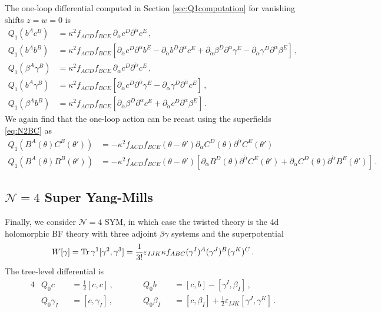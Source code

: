 \documentclass[11pt]{article}
\begin{document}
The one-loop differential computed in Section \ref{sec:Q1computation} for vanishing shifts $z=w=0$ is
\begin{align}
     Q_1 (b^A c^B ) 
        &=  \kappa^2 f_{ACD}f_{BCE} \, \partial_{\dot\alpha} c^D\partial^{\dot\alpha} c^E\,,  \\
     Q_1(b^A b^B) 
        &= \kappa^2 f_{ACD}f_{BCE} \left[\partial_{\dot\alpha} c^D \partial^{\dot\alpha} b^E -\partial_{\dot\alpha} b^D\partial^{\dot\alpha} c^E + \partial_{\dot\alpha}\beta^D\partial^{\dot\alpha}{\gamma}^E  - \partial_{\dot\alpha} {\gamma}^D\partial^{\dot\alpha}\beta^E \right] \,,\\
     Q_1 (\beta^A {\gamma}^B ) 
        &=  \kappa^2 f_{ACD}f_{BCE} \, \partial_{\dot\alpha} c^D\partial^{\dot\alpha} c^E\,, \\
    Q_1(b^A{\gamma}^B) 
        &= \kappa^2 f_{ACD}f_{BCE} \left[\partial_{\dot\alpha} c^D \partial^{\dot\alpha} {\gamma}^E-\partial_{\dot\alpha} \gamma^D \partial^{\dot\alpha} c^E\right]\,, \\
    Q_1(\beta^A b^B) 
        &= \kappa^2 f_{ACD}f_{BCE} \left[ \partial_{\dot\alpha} \beta^D \partial^{\dot\alpha} c^E + \partial_{\dot\alpha} c^D \partial^{\dot\alpha} \beta^E \right] \, .
\end{align}
We again find that the one-loop action can be recast using the superfields \eqref{eq:N2BC} as
\begin{align}
    Q_1(B^A(\theta)C^B(\theta')) 
        &= -\kappa^2 f_{ACD}f_{BCE} (\theta-\theta') \partial_{\dot\alpha} C^D(\theta) \partial^{\dot\alpha} C^E(\theta') \label{eq:Q1N2} \\
    Q_1( B^A(\theta) B^B(\theta') ) 
        &= -\kappa^2 f_{ACD}f_{BCE} (\theta-\theta') \left[\partial_{\dot\alpha} B^D(\theta) \partial^{\dot\alpha} C^E(\theta')+\partial_{\dot\alpha} C^D(\theta) \partial^{\dot\alpha} B^E(\theta')\right] \, .
\end{align}

\subsection{\texorpdfstring{$\mathcal{N}=4$}{N=4} Super Yang-Mills}
\label{sec:N4}
Finally, we consider $\mathcal{N}=4$ SYM, in which case the twisted theory is the 4d holomorphic BF theory with three adjoint $\beta\gamma$ systems and the superpotential
\begin{align}
     W[\gamma] = \Tr \gamma^1[\gamma^2,\gamma^3] = \frac{1}{3!} \varepsilon_{IJK} \kappa f_{ABC} (\gamma^I)^A(\gamma^J)^B(\gamma^K)^C \, .
\end{align}
The tree-level differential is
\begin{alignat}{4}
    & Q_0 c 
        &&= \frac{1}{2}[c,c] \, , \qquad  
        && Q_0 b &&= [c,b] - [\gamma^I,\beta_I]\,, \\
    & Q_0 \gamma_I 
        &&= [c, \gamma_I] \, , \qquad  
        &&  Q_0 \beta_I 
        &&= [c,\beta_I] + \frac{1}{2}\varepsilon_{IJK}[\gamma^J,\gamma^K] \, .
\end{alignat}
\end{document}

